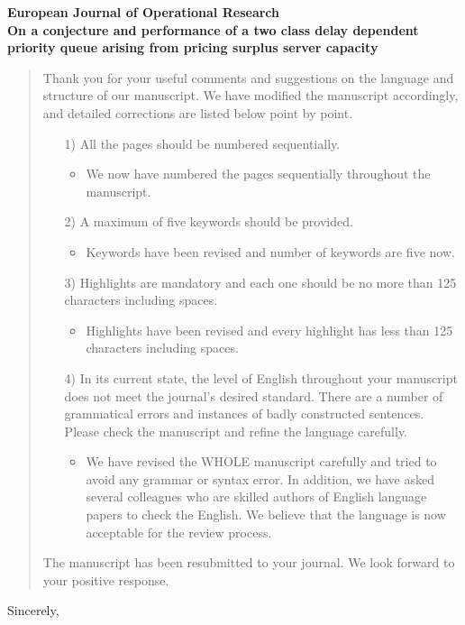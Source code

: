 \documentclass{letter}
\begin{document}
\begin{letter}{\large \bfseries European Journal of Operational Research\\ On a conjecture and performance of a two class delay dependent priority
queue arising from pricing surplus server capacity}
\begin{quotation}
\fontsize{11pt}{15pt}\selectfont %
Thank you for your useful comments and suggestions on the language and structure of our manuscript. We have modified the manuscript accordingly, and detailed corrections are listed below point by point. 
\begin{enumerate}
\item[1)] All the pages should be numbered sequentially.
{\color{blue}\begin{itemize}[label={\checkmark}]
\item We now have numbered the pages sequentially throughout the manuscript. 
\end{itemize}}
\item[2)] A maximum of five keywords should be provided.
{\color{blue}\begin{itemize}[label={\checkmark}]
\item Keywords have been revised and number of keywords are five now.
\end{itemize}}
\item[3)] Highlights are mandatory and each one should be no more than 125 characters including spaces.
{\color{blue}\begin{itemize}[label={\checkmark}]
\item Highlights have been revised and every highlight has less than 125 characters including spaces.
\end{itemize}}
\item[4)] In its current state, the level of English throughout your manuscript does not meet the journal's desired standard. There are a number of grammatical errors and instances of badly constructed sentences. Please check the manuscript and refine the language carefully.
{\color{blue}\begin{itemize}[label={\checkmark}]
\item We have revised the WHOLE manuscript carefully and tried to avoid any grammar or syntax error. In addition, we have asked several colleagues who are skilled authors of English language papers to check the English. We believe that the language is now acceptable for the review process. 
\end{itemize}}
\end{enumerate} 
The manuscript has been resubmitted to your journal. We look forward to your positive response. 

\end{quotation}

\closing{Sincerely,}


\end{letter}
\end{document}
